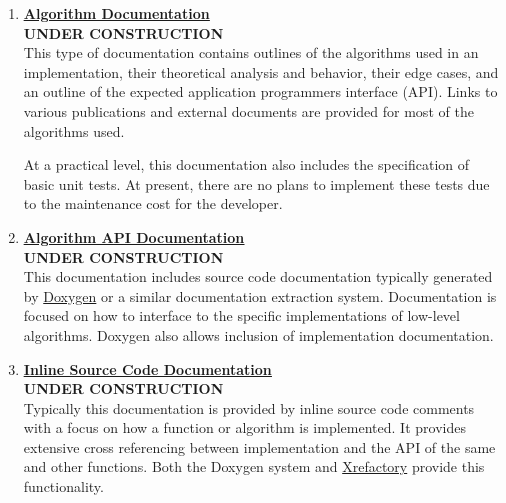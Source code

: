 \documentclass[12pt]{article}
\begin{document}
\begin{enumerate}
\item \href{../document-level5/document-level5.pdf}{\bf \underline{Algorithm Documentation}} \\
{\bf UNDER CONSTRUCTION}\\
  This type of documentation contains outlines of the
  algorithms used in an implementation, their theoretical analysis
  and behavior, their edge cases, and an outline of the expected
  application programmers interface (API).  Links to various publications
  and external documents are provided for most of the algorithms
  used.

  At a practical level, this documentation also includes the
  specification of basic unit tests.  At present, there are no plans to implement these tests due to the
  maintenance cost for the developer.

\item \href{../document-level6/document-level6.pdf}{\bf \underline{Algorithm API Documentation}}\\
{\bf UNDER CONSTRUCTION}\\
  This documentation includes source code
  documentation typically generated by \href{http://www.stack.nl/~dimitri/doxygen/}{Doxygen} or a similar
  documentation extraction system.  Documentation is focused on how to interface
  to the specific implementations of low-level algorithms. Doxygen
  also allows inclusion of implementation documentation.

\item \href{../doccument-level7/document-level-7.pdf}{\bf \underline{Inline Source Code Documentation}}\\
{\bf UNDER CONSTRUCTION}\\
  Typically this documentation is provided by inline source code comments with a focus on how a function
  or algorithm is implemented.  It provides extensive cross referencing between
  implementation and the API of the same and other functions.
  Both the Doxygen system and \href {http://www.xref.sk/xrefactory/main.html}{Xrefactory} provide this
  functionality.
  








\end{enumerate}
\end{document}
